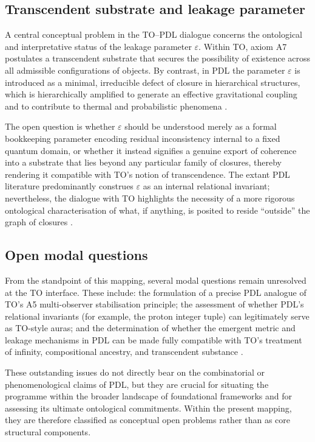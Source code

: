 \documentclass{article}
\begin{document}
\subsection{Transcendent substrate and leakage parameter}
\label{subsec:transcendent_leakage}

A central conceptual problem in the TO–PDL dialogue concerns the ontological and interpretative status of the leakage parameter \(\varepsilon\). Within TO, axiom A7 postulates a transcendent substrate that secures the possibility of existence across all admissible configurations of objects. By contrast, in PDL the parameter \(\varepsilon\) is introduced as a minimal, irreducible defect of closure in hierarchical structures, which is hierarchically amplified to generate an effective gravitational coupling and to contribute to thermal and probabilistic phenomena \citep{Exponent_18_PDL_2026,Coherence_Leakage_18_2026}.

The open question is whether \(\varepsilon\) should be understood merely as a formal bookkeeping parameter encoding residual inconsistency internal to a fixed quantum domain, or whether it instead signifies a genuine export of coherence into a substrate that lies beyond any particular family of closures, thereby rendering it compatible with TO’s notion of transcendence. The extant PDL literature predominantly construes \(\varepsilon\) as an internal relational invariant; nevertheless, the dialogue with TO highlights the necessity of a more rigorous ontological characterisation of what, if anything, is posited to reside “outside” the graph of closures \citep{PDL_TO_dialogue,PDL_position}.

\subsection{Open modal questions}
\label{subsec:modal_open}

From the standpoint of this mapping, several modal questions remain unresolved at the TO interface. These include: the formulation of a precise PDL analogue of TO’s A5 multi-observer stabilisation principle; the assessment of whether PDL’s relational invariants (for example, the proton integer tuple) can legitimately serve as TO-style auras; and the determination of whether the emergent metric and leakage mechanisms in PDL can be made fully compatible with TO’s treatment of infinity, compositional ancestry, and transcendent substance
\citep{PDL_TO_dialogue,PDL_position}.

These outstanding issues do not directly bear on the combinatorial or phenomenological claims of PDL, but they are crucial for situating the programme within the broader landscape of foundational frameworks and for assessing its ultimate ontological commitments. Within the present mapping, they are therefore classified as conceptual open problems rather than as core structural components.
\end{document}
